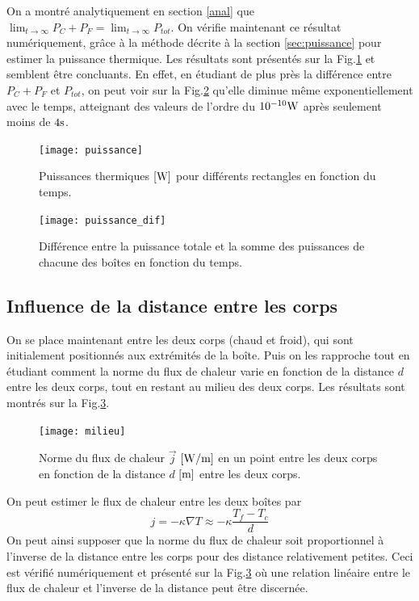 \documentclass[a4paper,12pt,oneside]{article}
\begin{document}
On a montré analytiquement en section \ref{anal} que $\lim_{t \rightarrow \infty}P_C+P_F=\lim_{t \rightarrow \infty} P_{tot}$. On vérifie maintenant ce résultat numériquement, grâce à la méthode décrite à la section \ref{sec:puissance} pour estimer la puissance thermique. Les résultats sont présentés sur la Fig.\ref{puissance} et semblent être concluants. En effet, en étudiant de plus près la différence entre $P_C+P_F$ et $P_{tot}$, on peut voir sur la Fig.\ref{puissance_dif} qu'elle diminue même exponentiellement avec le temps, atteignant des valeurs de l'ordre du $10^{-10} \rm W$ après seulement moins de $4 \rm s$.

\begin{figure}[H]
    \centering
    \texttt{[image: puissance]}
    \caption{Puissances thermiques $\rm{[W]}$ pour différents rectangles en fonction du temps.}
    \label{puissance}
\end{figure}

\begin{figure}[H]
    \centering
    \texttt{[image: puissance\_dif]}
    \caption{Différence entre la puissance totale et la somme des puissances de chacune des boîtes en fonction du temps.}
    \label{puissance_dif}
\end{figure}

\subsection{Influence de la distance entre les corps}
On se place maintenant entre les deux corps (chaud et froid), qui sont initialement positionnés aux extrémités de la boîte. Puis on les rapproche tout en étudiant comment la norme du flux de chaleur varie en fonction de la distance $d$ entre les deux corps, tout en restant au milieu des deux corps. Les résultats sont montrés sur la Fig.\ref{milieu}.

\begin{figure}[H]
    \centering
    \texttt{[image: milieu]}
    \caption{Norme du flux de chaleur $\Vec{j}$ $\rm [W/m]$ en un point entre les deux corps en fonction de la distance $d$ $\rm [m]$ entre les deux corps.}
    \label{milieu}
\end{figure}

On peut estimer le flux de chaleur entre les deux boîtes par 
\[ j= - \kappa \nabla T \approx - \kappa \frac{T_f - T_c}{d} \]
On peut ainsi supposer que la norme du flux de chaleur soit proportionnel à l'inverse de la distance entre les corps pour des distance relativement petites. Ceci est vérifié numériquement et présenté sur la Fig.\ref{milieu} où une relation linéaire entre le flux de chaleur et l'inverse de la distance peut être discernée.
 
\end{document}

